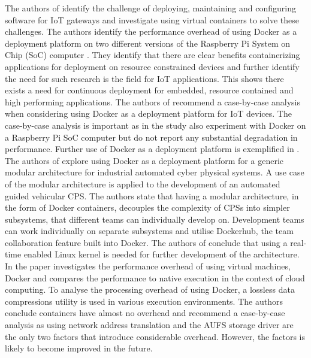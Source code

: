 The authors of \cite{2iot} identify the challenge of deploying, maintaining and configuring software for IoT gateways and investigate using virtual containers to solve these challenges. The authors identify the performance overhead of using Docker as a deployment platform on two different versions of the Raspberry Pi System on Chip (SoC) computer \cite{raspberry}. They identify that there are clear benefits containerizing applications for deployment on resource constrained devices and further identify the need for such research is the field for IoT applications. This shows there exists a need for continuous deployment for embedded, resource contained and high performing applications. The authors of \cite{2iot} recommend a case-by-case analysis when considering using Docker as a deployment platform for IoT devices. The case-by-case analysis is important as in \cite{gonz} the study also experiment with Docker on a Raspberry Pi SoC computer but do not report any substantial degradation in performance. Further use of Docker as a deployment platform is exemplified in \cite{gonz}. The authors of \cite{gonz} explore using Docker as a deployment platform for a generic modular architecture for industrial automated cyber physical systems. A use case of the modular architecture is applied to the development of an automated guided vehicular CPS. The authors state that having a modular architecture, in the form of Docker containers, decouples the complexity of CPSs into simpler subsystems, that different teams can individually develop on. Development teams can work individually on separate subsystems and utilise Dockerhub, the team collaboration feature built into Docker. The authors of \cite{gonz} conclude that using a real-time enabled Linux kernel is needed for further development of the architecture. \\

In \cite{p6} the paper investigates the performance overhead of using virtual machines, Docker and compares the performance to native execution in the context of cloud computing. To analyse the processing overhead of using Docker, a lossless data compressions utility is used in various execution environments. The authors conclude containers have almost no overhead and recommend a case-by-case analysis as using network address translation and the AUFS storage driver are the only two factors that introduce considerable overhead. However, the factors is likely to become improved in the future. \\

